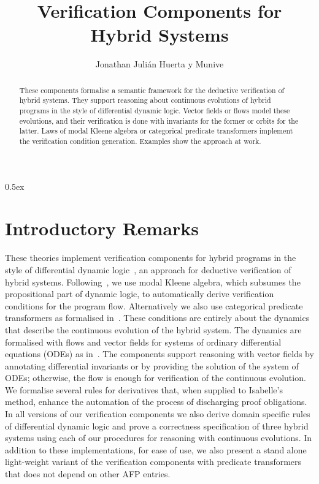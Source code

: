 \documentclass[11pt,a4paper]{article}
\begin{document}
\title{Verification Components for Hybrid Systems}
\author{Jonathan Juli\'an Huerta y Munive}
\maketitle

\begin{abstract}
  These components formalise a semantic framework for the deductive 
  verification of hybrid systems. They support reasoning about continuous 
  evolutions of hybrid programs in the style of differential dynamic logic.
  Vector fields or flows model these evolutions, and their verification is 
  done with invariants for the former or orbits for the latter. Laws of
  modal Kleene algebra or categorical predicate transformers implement 
  the verification condition generation. Examples show the approach at work.
\end{abstract}

\tableofcontents

\parindent 0pt\parskip 0.5ex

\section{Introductory Remarks}

These theories implement verification components for hybrid programs in the style of differential dynamic logic~\cite{Platzer10}, an approach for deductive verification of hybrid systems. Following~\cite{afp:vericomp}, we use modal Kleene algebra, which subsumes the propositional part of dynamic logic, to automatically derive verification conditions for the program flow. Alternatively we also use categorical predicate transformers as formalised in~\cite{afp:transem}. These conditions are entirely about the dynamics that describe the continuous evolution of the hybrid system. The dynamics are formalised with flows and vector fields for systems of ordinary differential equations (ODEs) as in~\cite{ImmlerH12a}. The components support reasoning with vector fields by annotating differential invariants or by providing the solution of the system of ODEs; otherwise, the flow is enough for verification of the continuous evolution. We formalise several rules for derivatives that, when supplied to Isabelle's  method, enhance the automation of the process of discharging proof obligations. In all versions of our verification components we also derive domain specific rules of differential dynamic logic and prove a correctness specification of three hybrid systems using each of our procedures for reasoning with continuous evolutions. In addition to these implementations, for ease of use, we also present a stand alone light-weight variant of the verification components with predicate transformers that does not depend on other AFP entries.
\end{document}
